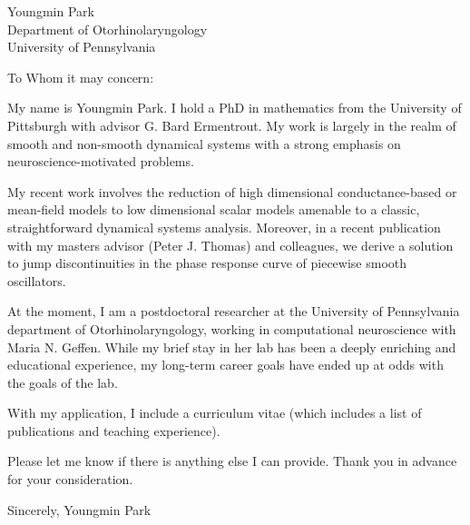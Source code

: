 \documentclass[a4paper,11pt]{letter}
\begin{document}
\begin{letter}{Youngmin Park \\ Department of Otorhinolaryngology\\ University of Pennsylvania}
 

\opening{To Whom it may concern:}

My name is Youngmin Park. I hold a PhD in mathematics from the University of Pittsburgh with advisor G. Bard Ermentrout. My work is largely in the realm of smooth and non-smooth dynamical systems with a strong emphasis on neuroscience-motivated problems.

My recent work involves the reduction of high dimensional conductance-based or mean-field models to low dimensional scalar models amenable to a classic, straightforward dynamical systems analysis. Moreover, in a recent publication with my masters advisor (Peter J. Thomas) and colleagues, we derive a solution to jump discontinuities in the phase response curve of piecewise smooth oscillators.

At the moment, I am a postdoctoral researcher at the University of Pennsylvania department of Otorhinolaryngology, working in computational neuroscience with Maria N. Geffen. While my brief stay in her lab has been a deeply enriching and educational experience, my long-term career goals have ended up at odds with the goals of the lab.

With my application, I include a curriculum vitae (which includes a list of publications and teaching experience).

Please let me know if there is anything else I can provide. Thank you in advance for your consideration.

Sincerely,
Youngmin Park
 
 
 
\end{letter}
\end{document}
